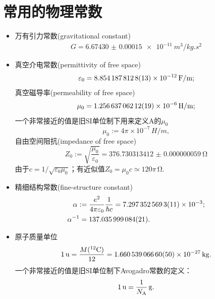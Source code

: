 \section{常用的物理常数}
\begin{itemize}
	\item 万有引力常数(gravitational constant)
		\begin{align}
			G=\SI{6.67430(15)e-11}{m^3/kg.s^2}
		\end{align}
	
	\item 真空介电常数(permittivity of free space)
		\begin{align}
			\varepsilon_0=\SI{8.8541878128(13)E-12}{F/m};
		\end{align}
		真空磁导率(permeability of free space)
		\begin{align}
			\mu_0=\SI{1.25663706212(19)E-6}{H/m};
		\end{align}
		一个非常接近的值是旧SI单位制下用来定义A的$\mu_0$
		\[
			\mu_0:=4\pi\times 10^{-7}\,\si{H/m},
		\]
		自由空间阻抗(impedance of free space)
		\begin{equation}
			Z_0:=\sqrt{\frac{\mu_0}{\varepsilon_0}}=\SI{376.730313412(59)}{\ohm}
		\end{equation}
		由于$c=1/\sqrt{\varepsilon_0\mu_0}$；有近似值$Z_0=\mu_0c\simeq 120\pi\,\si{\ohm}.$
	
	\item 精细结构常数(fine-structure constant)
		\begin{align}
			\alpha:={}&\frac{e^2}{4\pi\varepsilon_0}\frac1{\hbar c}=\num{7.2973525693(11)E-3};\\
			\alpha^{-1}={}&\num{137.035999084(21)}.
		\end{align}
	
	\item 原子质量单位
		\begin{align}
			\SI{1}{u}=\frac{M(\nucli{12}{C})}{12}=\SI{1.66053906660(50)E-27}{kg}.
		\end{align}
		一个非常接近的值是旧SI单位制下Avogadro常数的定义：
		\[
			\SI{1}{u}=\frac1{\NA}\,\si{g}.
		\]
	

\end{itemize}
